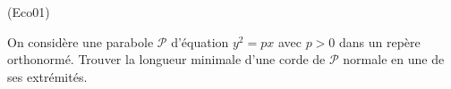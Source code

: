 \begin{tiny}(Eco01)\end{tiny} On considère une parabole $\mathcal P$ d'équation $y^2=px$ avec $p>0$ dans un repère orthonormé. Trouver la longueur minimale d'une corde de $\mathcal P$ normale en une de ses extrémités.
